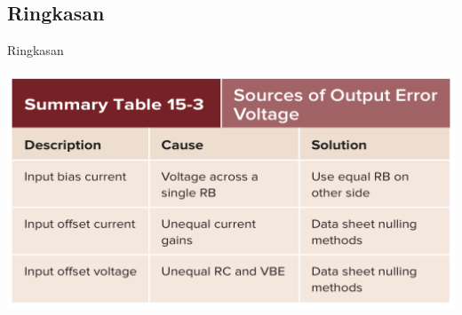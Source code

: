 \documentclass[aspectratio=169]{beamer}
\begin{document}
\subsection{Ringkasan}
\begin{frame}{Ringkasan}
	\begin{center}
		\includegraphics[height=0.7\textheight]{gambar/01.diff-amp/01.ringkasan_3}
	\end{center}
\end{frame}
\end{document}

